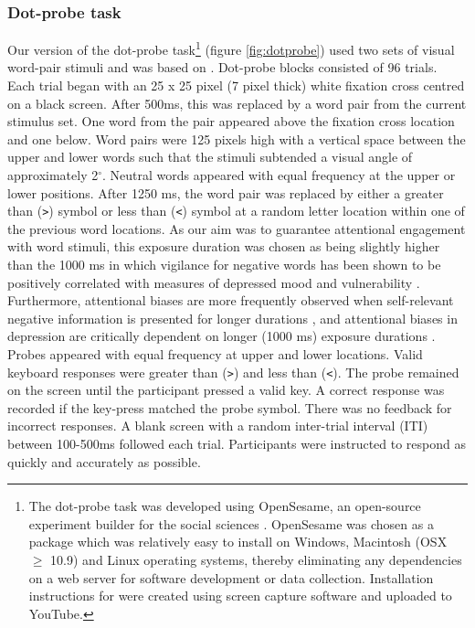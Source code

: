 \documentclass[man,floatsintext,a4paper,biblatex]{apa6}\usepackage[]{graphicx}\usepackage[]{color}
\begin{document}


\subsubsection{Dot-probe task}

Our version of the dot-probe task\footnote{The dot-probe task was
developed using OpenSesame, an open-source experiment builder for the
social sciences \parencite{mathot_opensesame_2011}. OpenSesame was
chosen as a package which was relatively easy to install on Windows,
Macintosh (OSX ${\geq}$ 10.9) and Linux operating systems, thereby
eliminating any dependencies on a web server for software development
or data collection. Installation instructions for were created
using screen capture software and uploaded to YouTube.} (figure
\ref{fig:dotprobe}) used two sets of visual word-pair stimuli and was
based on \textcite{yang_attention_2015}. Dot-probe blocks consisted
of 96 trials. Each trial began with an 25 x 25 pixel (7 pixel thick)
white fixation cross centred on a black screen. After 500ms, this was
replaced by a word pair from the current stimulus set. One word from the
pair appeared above the fixation cross location and one below. Word pairs
were 125 pixels high with a vertical space between the upper and lower
words such that the stimuli subtended a visual angle of approximately
2$^{\circ}$. Neutral words appeared with equal frequency at the upper
or lower positions. After 1250 ms, the word pair was replaced by either
a greater than (\texttt{>}) symbol or less than (\texttt{<}) symbol at
a random letter location within one of the previous word locations. As
our aim was to guarantee attentional engagement with word stimuli,
this exposure duration was chosen as being slightly higher than the
1000 ms in which vigilance for negative words has been shown to be
positively correlated with measures of depressed mood and vulnerability
\parencite{bradley_attentional_1997}. Furthermore, attentional biases
are more frequently observed when self-relevant negative information is
presented for longer durations \parencite{koster_understanding_2011},
and attentional biases in depression are critically dependent on longer
(1000 ms) exposure durations \parencite{donaldson_rumination_2007}. Probes
appeared with equal frequency at upper and lower locations. Valid keyboard
responses were greater than (\texttt{>}) and less than (\texttt{<}). The
probe remained on the screen until the participant pressed a valid
key. A correct response was recorded if the key-press matched the probe
symbol. There was no feedback for incorrect responses. A blank screen
with a random inter-trial interval (ITI) between 100-500ms followed each
trial. Participants were instructed to respond as quickly and accurately
as possible.
\end{document}
